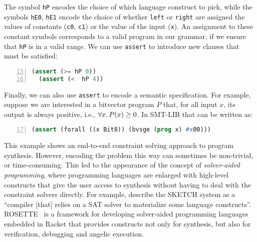 %
The symbol \texttt{hP} encodes the choice of which language construct to pick,
while the symbols \texttt{hE0}, \texttt{hE1} encode the choice of whether
\texttt{left} or \texttt{right} are assigned the values of constants
(\texttt{c0}, \texttt{c1}) or the value of the input (\texttt{x}).
An assignment to these constant symbols corresponds to a valid program in our
grammar, if we ensure that \texttt{hP} is in a valid range.
We can use \texttt{assert} to introduce new clauses that must be satisfied:
%
\begin{lstlisting}[language=Lisp,
  numbers=left,
  firstnumber=15,
  morekeywords={assert},
  xleftmargin=.2\textwidth, xrightmargin=.2\textwidth]
  (assert (>= hP 0))
  (assert (<  hP 4))
\end{lstlisting}
%
Finally, we can also use \texttt{assert} to encode a semantic specification.
For example, suppose we are interested in a bitvector program $P$ that, for all
input $x$, its output is always positive, i.e., $\forall x\ldotp P(x) \geq 0$.
In SMT-LIB that can be written as:
%
\begin{lstlisting}[language=Lisp,
  numbers=left,
  firstnumber=17,
  morekeywords={assert},
  xleftmargin=.2\textwidth, xrightmargin=.2\textwidth]
  (assert (forall ((x Bit8)) (bvsge (prog x) #x00)))
\end{lstlisting}
 
This example shows an end-to-end constraint solving approach to program
synthesis. However, encoding the problem this way can sometimes be non-trivial,
or time-consuming.
This led to the appearance of the concept of \textit{solver-aided programming},
where programming languages are enlarged with high-level constructs that give
the user access to synthesis without having to deal with the constraint solvers
directly.
For example, \citeauthor{Gulwani2017} describe the SKETCH system as a ``compiler
[that] relies on a SAT solver to materialize some language constructs''.
ROSETTE~\cite{Torlak:2013:GSL} is a framework for developing solver-aided
programming languages embedded in Racket that provides constructs not only for
synthesis, but also for verification, debugging and angelic execution.
